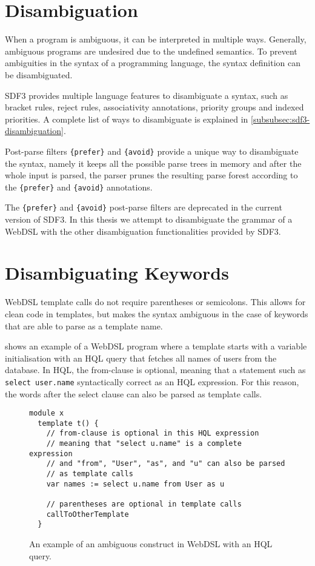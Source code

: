   \section{\label{sec:webdsl-sdf3-disambiguation}Disambiguation}
  
    When a program is ambiguous, it can be interpreted in multiple ways. Generally, ambiguous programs are undesired due to the undefined semantics. To prevent ambiguities in the syntax of a programming language, the syntax definition can be disambiguated.

    SDF3 provides multiple language features to disambiguate a syntax, such as bracket rules, reject rules, associativity annotations, priority groups and indexed priorities. A complete list of ways to disambiguate is explained in \cref{subsubsec:sdf3-disambiguation}.

    Post-parse filters \texttt{\{prefer\}} and \texttt{\{avoid\}} provide a unique way to disambiguate the syntax, namely it keeps all the possible parse trees in memory and after the whole input is parsed, the parser prunes the resulting parse forest according to the \texttt{\{prefer\}} and \texttt{\{avoid\}} annotations.
    
    The \texttt{\{prefer\}} and \texttt{\{avoid\}} post-parse filters are deprecated in the current version of SDF3. In this thesis we attempt to disambiguate the grammar of a WebDSL with the other disambiguation functionalities provided by SDF3.

    \section{Disambiguating Keywords}

      WebDSL template calls do not require parentheses or semicolons. This allows for clean code in templates, but makes the syntax ambiguous in the case of keywords that are able to parse as a template name.
      
       shows an example of a WebDSL program where a template starts with a variable initialisation with an HQL query that fetches all names of users from the database. In HQL, the from-clause is optional, meaning that a statement such as \texttt{select user.name} syntactically correct as an HQL expression. For this reason, the words after the select clause can also be parsed as template calls.

      \begin{figure}
        \begin{verbatim}
module x
  template t() {
    // from-clause is optional in this HQL expression
    // meaning that "select u.name" is a complete expression
    // and "from", "User", "as", and "u" can also be parsed
    // as template calls
    var names := select u.name from User as u

    // parentheses are optional in template calls
    callToOtherTemplate
  }
        \end{verbatim}
        \caption{\label{fig:sdf3-keywords-ambiguous}An example of an ambiguous construct in WebDSL with an HQL query.}
      \end{figure}

